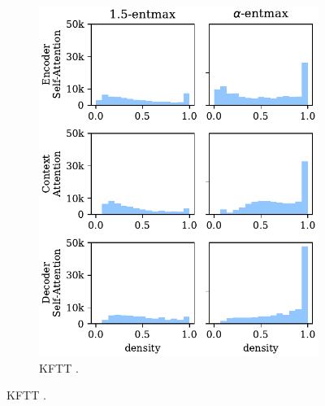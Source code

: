 \begin{figure}[!htbp]
\begin{subfigure}[b]{.49\linewidth}
        \includegraphics[width=\linewidth]{Figures/hist_densities_ja.pdf}
        \caption{%
            \label{fig:hist_densities_ja}%
            KFTT .}
    \end{subfigure}


\end{figure}

